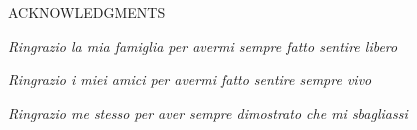 
ACKNOWLEDGMENTS

\vspace*{5\baselineskip}

\begin{flushright}
    \textit{Ringrazio la mia famiglia per avermi sempre fatto sentire libero}

    \textit{Ringrazio i miei amici per avermi fatto sentire sempre vivo}
    
    \textit{Ringrazio me stesso per aver sempre dimostrato che mi sbagliassi }

\end{flushright}
